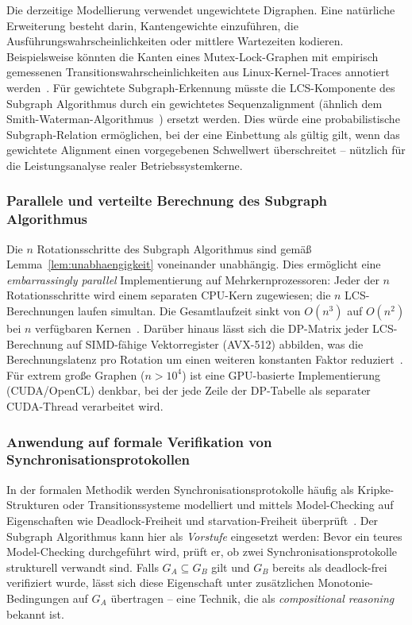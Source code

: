 ﻿\documentclass[a4paper,12pt]{article}
\theoremstyle{definition}
\begin{document}
Die derzeitige Modellierung verwendet ungewichtete Digraphen.
Eine natürliche Erweiterung besteht darin, Kantengewichte einzuführen,
die Ausführungswahrscheinlichkeiten oder mittlere Wartezeiten kodieren.
Beispielsweise könnten die Kanten eines Mutex-Lock-Graphen mit empirisch
gemessenen Transitionswahrscheinlichkeiten aus Linux-Kernel-Traces annotiert
werden~\cite{love2010linux}.
Für gewichtete Subgraph-Erkennung müsste die LCS-Komponente des Subgraph
Algorithmus durch ein gewichtetes Sequenzalignment (ähnlich dem
Smith-Waterman-Algorithmus~\cite{smith1981identification}) ersetzt werden.
Dies würde eine probabilistische Subgraph-Relation ermöglichen, bei der
eine Einbettung als gültig gilt, wenn das gewichtete Alignment einen
vorgegebenen Schwellwert überschreitet -- nützlich für die
Leistungsanalyse realer Betriebssystemkerne.

\subsubsection{Parallele und verteilte Berechnung des Subgraph Algorithmus}

Die $n$ Rotationsschritte des Subgraph Algorithmus sind gemäß
Lemma~\ref{lem:unabhaengigkeit} voneinander unabhängig.
Dies ermöglicht eine \emph{embarrassingly parallel} Implementierung auf
Mehr\-kern\-pro\-zes\-so\-ren: Jeder der $n$ Rotationsschritte wird einem
separaten CPU-Kern zugewiesen; die $n$ LCS-Berechnungen laufen simultan.
Die Gesamtlaufzeit sinkt von $O(n^3)$ auf $O(n^2)$ bei $n$ verfügbaren
Kernen~\cite{openmp2011}.
Darüber hinaus lässt sich die DP-Matrix jeder LCS-Berechnung auf SIMD-fähige
Vektorregister (AVX-512) abbilden, was die Berechnungslatenz pro Rotation
um einen weiteren konstanten Faktor reduziert~\cite{rognes2011faster}.
Für extrem große Graphen ($n > 10^4$) ist eine GPU-basierte Implementierung
(CUDA/OpenCL) denkbar, bei der jede Zeile der DP-Tabelle als separater
CUDA-Thread verarbeitet wird.

\subsubsection{Anwendung auf formale Verifikation von Synchronisationsprotokollen}

In der formalen Methodik werden Synchronisationsprotokolle häufig als
Kripke-Strukturen oder Transitionssysteme modelliert und mittels
Model-Checking auf Eigenschaften wie Deadlock-Freiheit und
starvation-Freiheit überprüft~\cite{clarke1999model}.
Der Subgraph Algorithmus kann hier als \emph{Vorstufe} eingesetzt werden:
Bevor ein teures Model-Checking durchgeführt wird, prüft er, ob zwei
Synchronisationsprotokolle strukturell verwandt sind. Falls
$G_A \subseteq G_B$ gilt und $G_B$ bereits als deadlock-frei verifiziert
wurde, lässt sich diese Eigenschaft unter zusätzlichen Monotonie-Bedingungen
auf $G_A$ übertragen -- eine Technik, die als
\emph{compositional reasoning}~\cite{mcmillan1993symbolic} bekannt ist.
\end{document}
